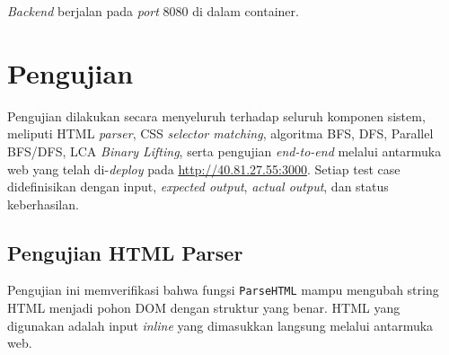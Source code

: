 \textit{Backend} berjalan pada \textit{port} 8080 di dalam container.



\section{Pengujian}

Pengujian dilakukan secara menyeluruh terhadap seluruh komponen sistem, meliputi HTML \textit{parser}, CSS \textit{selector matching}, algoritma BFS, DFS, Parallel BFS/DFS, LCA \textit{Binary Lifting}, serta pengujian \textit{end-to-end} melalui antarmuka web yang telah di-\textit{deploy} pada \url{http://40.81.27.55:3000}. Setiap test case didefinisikan dengan input, \textit{expected output}, \textit{actual output}, dan status keberhasilan.

\subsection{Pengujian HTML Parser}

Pengujian ini memverifikasi bahwa fungsi \texttt{ParseHTML} mampu mengubah string HTML menjadi pohon DOM dengan struktur yang benar. HTML yang digunakan adalah input \textit{inline} yang dimasukkan langsung melalui antarmuka web.

